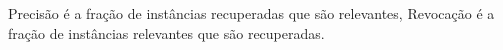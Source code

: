 

% 
% 
% 
% 







Precisão é a fração de instâncias recuperadas que são relevantes, 
Revocação é a fração de instâncias relevantes que são recuperadas.

